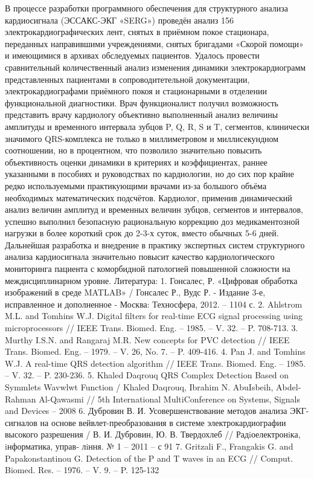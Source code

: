 \documentclass[runningheads]{AIIT}
\begin{document}
В процессе разработки программного обеспечения для структурного анализа кардиосигнала (ЭССАКС-ЭКГ «SERG») проведён анализ 156 электрокардиографических лент, снятых в приёмном покое стационара, переданных направившими учреждениями, снятых бригадами «Скорой помощи» и имеющимися в архивах обследуемых пациентов.
Удалось провести сравнительный количественный анализ изменения динамики электрокардиограмм представленных пациентами в сопроводитетельной документации, электрокардиографами приёмного покоя и стационарными в отделении функциональной диагностики.
Врач функционалист получил возможность представить врачу кардиологу объективно выполненный анализ величины амплитуды и временного интервала  зубцов P, Q, R, S и T, сегментов, клинически значимого QRS-комплекса не только в миллиметровом и миллисекундном соотношении, но в процентном, что позволило значительно повысить объективность оценки динамики в критериях и коэффициентах, раннее указанными в  пособиях и руководствах по кардиологии, но до сих пор крайне редко используемыми практикующими врачами из-за большого объёма необходимых математических подсчётов.
 Кардиолог, применив динамический анализ величин амплитуд и временных величин зубцов, сегментов и интервалов,  успешно выполнил безопасную рациональную коррекцию доз медикаментозной нагрузки в более короткий срок до 2-3-х суток, вместо обычных 5-6 дней.
Дальнейшая разработка и внедрение в практику экспертных систем структурного анализа кардиосигнала значительно повысит качество кардиологического мониторинга пациента с коморбидной патологией повышенной сложности на междисциплинарном уровне.
Литература:
1.	Гонсалес, Р. «Цифровая обработка изображений в среде MATLAB» / Гонсалес Р., Вудс Р. - Издание 3-е, исправленное и дополненное - Москва: Техносфера, 2012. – 1104 с.
2.	Ahlstrom M.L. and Tomhins W.J. Digital filters for real-time ECG signal processing using microprocessors // IEEE Trans. Biomed. Eng. – 1985. – V. 32. – P. 708-713.
3.	Murthy I.S.N. and Rangaraj M.R. New concepts for PVC detection // IEEE Trans. Biomed. Eng. – 1979. – V. 26, No. 7. – P. 409-416.
4.	Pan J. and Tomhins W.J. A real-time QRS detection algorithm // IEEE Trans. Biomed. Eng. – 1985. – V. 32. – P. 230-236.
5.	Khaled Daqrouq QRS Complex Detection Based on Symmlets Wavwlwt Function / Khaled Daqrouq, Ibrahim N. AbuIsbeih, Abdel-Rahman Al-Qawasmi // 5th International MultiConference on Systems, Signals and Devices – 2008
6.	Дубровин В. И. Усовершенствование методов анализа ЭКГ-сигналов на основе вейвлет-преобразования в системе электрокардиографии высокого разрешения / В. И. Дубровин, Ю. В. Твердохлеб // Радiоелектронiка, iнформатика, управ- лiння. № 1 – 2011 – с 91
7.	Gritzali F., Frangakis G. and Papakonstantinou G. Detection of the P and T waves in an ECG // Comput. Biomed. Res. – 1976. – V. 9. – P. 125-132
\end{document}
